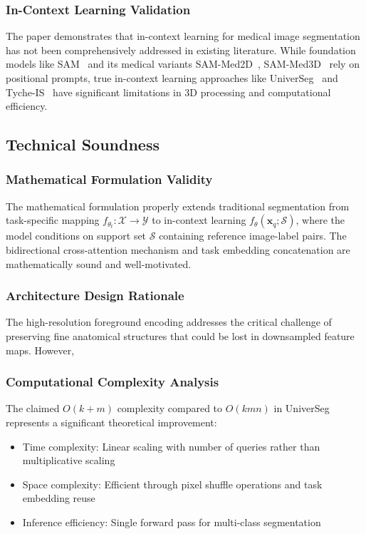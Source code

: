 \subsubsection{In-Context Learning Validation}
The paper demonstrates that in-context learning for medical image segmentation has not been comprehensively addressed in existing literature. While foundation models like SAM~\cite{kirillov2023segment} and its medical variants SAM-Med2D~\cite{cheng2023sam}, SAM-Med3D~\cite{wang2024sam} rely on positional prompts, true in-context learning approaches like UniverSeg~\cite{butoi2023universeg} and Tyche-IS~\cite{rakic2024tyche} have significant limitations in 3D processing and computational efficiency.

\subsection{Technical Soundness}
\subsubsection{Mathematical Formulation Validity}
The mathematical formulation properly extends traditional segmentation from task-specific mapping $f_{\theta_t}: \mathcal{X} \rightarrow \mathcal{Y}$ to in-context learning $f_\theta(\boldsymbol{x}_q; \mathcal{S})$, where the model conditions on support set $\mathcal{S}$ containing reference image-label pairs. The bidirectional cross-attention mechanism and task embedding concatenation are mathematically sound and well-motivated.

\subsubsection{Architecture Design Rationale}
 The high-resolution foreground encoding addresses the critical challenge of preserving fine anatomical structures that could be lost in downsampled feature maps. However, 

\subsubsection{Computational Complexity Analysis}
The claimed $O(k + m)$ complexity compared to $O(kmn)$ in UniverSeg represents a significant theoretical improvement:
\begin{itemize}
    \item Time complexity: Linear scaling with number of queries rather than multiplicative scaling
    \item Space complexity: Efficient through pixel shuffle operations and task embedding reuse
    \item Inference efficiency: Single forward pass for multi-class segmentation
\end{itemize}

